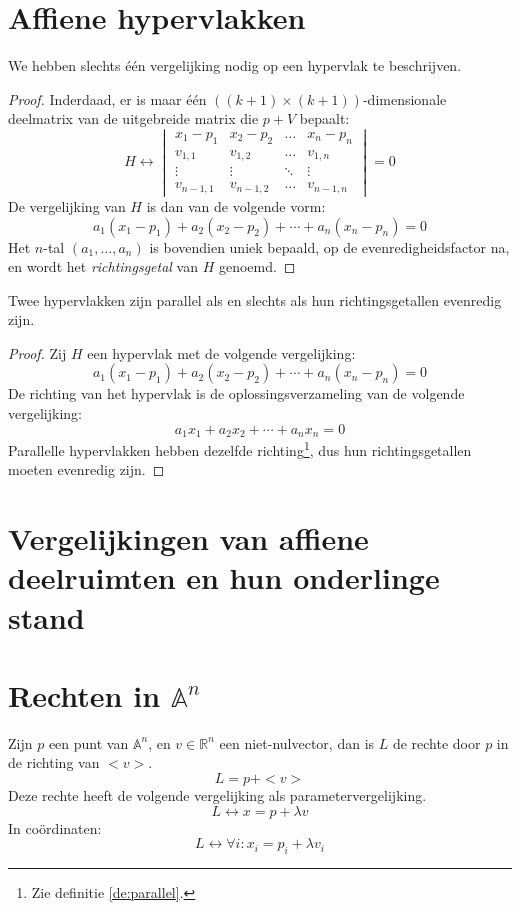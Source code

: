 \documentclass[main.tex]{subfiles}
\begin{document}
\section{Affiene hypervlakken}
\label{sec:affiene-hypervlakken}
\begin{st}
  We hebben slechts \'e\'en vergelijking nodig op een hypervlak te beschrijven.
  
  \begin{proof}
    Inderdaad, er is maar \'e\'en $((k+1)\times(k+1))$-dimensionale deelmatrix van de uitgebreide matrix die $p+V$ bepaalt:
    \[
    H \leftrightarrow
    \begin{vmatrix}
    x_{1}-p_{1}   & x_{2}-p_{2}  & \hdots & x_{n}-p_{n}\\
    v_{1,1}       & v_{1,2}      & \hdots & v_{1,n}\\
    \vdots        & \vdots       & \ddots & \vdots\\
    v_{n-1,1}     & v_{n-1,2}    & \hdots & v_{n-1,n} 
    \end{vmatrix}
    = 0
    \]
    De vergelijking van $H$ is dan van de volgende vorm:
    \[
    a_{1}(x_{1}-p_{1}) + a_{2}(x_{2}-p_{2}) + \dotsb + a_{n}(x_{n}-p_{n}) = 0
    \]
    Het $n$-tal $(a_{1},\dotsc,a_{n})$ is bovendien uniek bepaald, op de evenredigheidsfactor na, en wordt het \emph{richtingsgetal} van $H$ genoemd.
  \end{proof}
\end{st}

\begin{st}
  Twee hypervlakken zijn parallel als en slechts als hun richtingsgetallen evenredig zijn.
  \begin{proof}
  Zij $H$ een hypervlak met de volgende vergelijking:
  \[
    a_{1}(x_{1}-p_{1}) + a_{2}(x_{2}-p_{2}) + \dotsb + a_{n}(x_{n}-p_{n}) = 0
  \]
  De richting van het hypervlak is de oplossingsverzameling van de volgende vergelijking:
  \[
    a_{1}x_{1} + a_{2}x_{2} + \dotsb + a_{n}x_{n} = 0
  \]
  Parallelle hypervlakken hebben dezelfde richting\footnote{Zie definitie \ref{de:parallel}.}, dus hun richtingsgetallen moeten evenredig zijn.
  \end{proof}
\end{st}

\section{Vergelijkingen van affiene deelruimten en hun onderlinge stand}
\label{sec:vergelijkingen-van-affiene-deelruimten}

\section{Rechten in $\mathbb{A}^{n}$}
\begin{de}
  Zijn $p$ een punt van $\mathbb{A}^{n}$, en $v\in \mathbb{R}^{n}$ een niet-nulvector, dan is $L$ de rechte door $p$ in de richting van $<v>$.
  \[
  L = p + <v>
  \]
  Deze rechte heeft de volgende vergelijking als parametervergelijking.
  \[
  L \leftrightarrow x = p + \lambda v
  \]
  In co\"ordinaten:
  \[
  L \leftrightarrow \forall i: x_{i} = p_{i} + \lambda v_{i}
  \]
\end{de}
\end{document}
